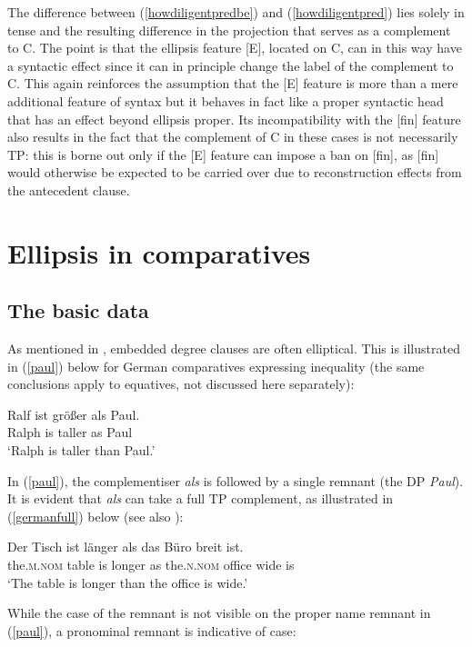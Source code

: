 The difference between (\ref{howdiligentpredbe}) and (\ref{howdiligentpred}) lies solely in tense and the resulting difference in the projection that serves as a complement to C. The point is that the ellipsis feature [E], located on C, can in this way have a syntactic effect since it can in principle change the label of the complement to C. This again reinforces the assumption that the [E] feature is more than a mere additional feature of syntax but it behaves in fact like a proper syntactic head that has an effect beyond ellipsis proper. Its incompatibility with the [fin] feature also results in the fact that the complement of C in these cases is not necessarily TP: this is borne out only if the [E] feature can impose a ban on [fin], as [fin] would otherwise be expected to be carried over due to reconstruction effects from the antecedent clause.

\section{Ellipsis in comparatives} \label{sec:6comparatives}
\subsection{The basic data} \label{sec:6basic}
As mentioned in , embedded degree clauses are often elliptical. This is illustrated in (\ref{paul}) below for German comparatives expressing inequality (the same conclusions apply to equatives, not discussed here separately):

\ea \gll Ralf ist größer als Paul. \label{paul}\\
Ralph is taller as Paul\\
\glt `Ralph is taller than Paul.'
\z

In (\ref{paul}), the complementiser \textit{als} is followed by a single remnant (the DP \textit{Paul}). It is evident that \textit{als} can take a full TP complement, as illustrated in (\ref{germanfull}) below (see also ):

\ea \gll Der Tisch ist länger als das Büro breit ist. \label{germanfull}\\
the.\textsc{m.nom} table is longer as the.\textsc{n.nom} office wide is\\
\glt `The table is longer than the office is wide.'
\z

While the case of the remnant is not visible on the proper name remnant in (\ref{paul}), a pronominal remnant is indicative of case:

